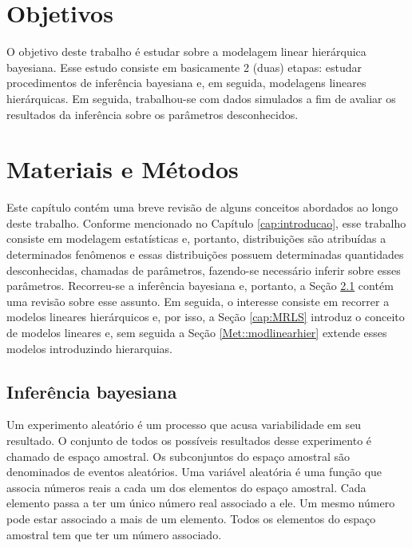 \documentclass[12pt,a4paper,header]{abnt}
\begin{document}

\newpage
\chapter{Objetivos}

O objetivo deste trabalho é estudar sobre a modelagem linear hierárquica bayesiana. Esse estudo consiste em basicamente 2 (duas) etapas: estudar procedimentos de inferência bayesiana e, em seguida, modelagens lineares hierárquicas. Em seguida, trabalhou-se com dados simulados a fim de avaliar os resultados da inferência sobre os parâmetros desconhecidos.


\newpage
\chapter{Materiais e Métodos}

Este capítulo contém uma breve revisão de alguns conceitos abordados ao longo deste trabalho. Conforme mencionado no Capítulo \ref{cap:introducao}, esse trabalho consiste em modelagem estatísticas e, portanto, distribuições são atribuídas a determinados fenômenos e essas distribuições possuem determinadas quantidades desconhecidas, chamadas de parâmetros, fazendo-se necessário inferir sobre esses parâmetros. Recorreu-se a inferência bayesiana e, portanto, a Seção \ref{Met::infbay} contém uma revisão sobre esse assunto. Em seguida, o interesse consiste em recorrer a modelos lineares hierárquicos e, por isso, a Seção \ref{cap:MRLS} introduz o conceito de modelos lineares e, sem seguida a Seção \ref{Met::modlinearhier} extende esses modelos introduzindo hierarquias.

\section{Inferência bayesiana}\label{Met::infbay}

Um experimento aleatório é um processo que acusa variabilidade em seu resultado. O conjunto de todos os possíveis resultados desse experimento é chamado de espaço amostral. Os subconjuntos do espaço amostral são denominados de eventos aleatórios. Uma variável aleatória é uma função que associa números reais a cada um dos elementos do espaço amostral. Cada elemento passa a ter um único número real associado a ele. Um mesmo número pode estar associado a mais de um elemento. Todos os elementos do espaço amostral tem que ter um número associado.
\end{document}
